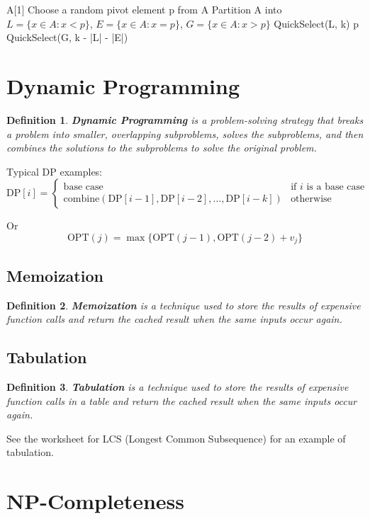 \documentclass[11pt,fleqn]{article}
\newtheorem*{definition}{Definition}
\begin{document}
\begin{algorithmic}
     
        \State \Return A[1]
    \EndIf
    \State Choose a random pivot element p from A
    \State Partition A into $L = \{x \in A : x < p\}$, $E = \{x \in A : x = p\}$, $G = \{x \in A : x > p\}$
        \State \Return QuickSelect(L, k)
        \State \Return p
    \Else
        \State \Return QuickSelect(G, k - |L| - |E|)
    \EndIf
    \EndFunction
\end{algorithmic}




\section{Dynamic Programming}

\begin{definition}
    \textbf{Dynamic Programming} is a problem-solving strategy that breaks a problem into smaller, overlapping subproblems, solves the subproblems, and then combines the solutions to the subproblems to solve the original problem.
\end{definition}

Typical DP examples: \[
    \text{DP}[i] = \begin{cases}
        \text{base case} & \text{if } i \text{ is a base case} \\
        \text{combine}(\text{DP}[i-1], \text{DP}[i-2], \ldots, \text{DP}[i-k]) & \text{otherwise}
    \end{cases}
\]

Or \[
    \text{OPT}(j) = \max \{ \text{OPT}(j-1), \text{OPT}(j-2) + v_j \}
\]

\subsection{Memoization}
\begin{definition}
    \textbf{Memoization} is a technique used to store the results of expensive function calls and return the cached result when the same inputs occur again.
\end{definition}

\subsection{Tabulation}
\begin{definition}
    \textbf{Tabulation} is a technique used to store the results of expensive function calls in a table and return the cached result when the same inputs occur again.
\end{definition}

See the worksheet for LCS (Longest Common Subsequence) for an example of tabulation.

\section{NP-Completeness}
\end{document}
